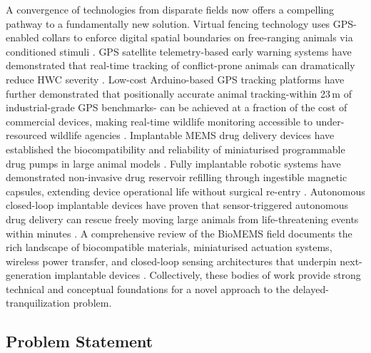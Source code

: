 \documentclass[12pt,a4paper]{article}
\begin{document}
    A convergence of technologies from disparate fields now offers a compelling pathway to a
    fundamentally new solution. Virtual fencing technology uses GPS-enabled collars to enforce
    digital spatial boundaries on free-ranging animals via conditioned stimuli \cite{gilbert2026}.
    GPS satellite telemetry-based early warning systems have demonstrated that real-time
    tracking of conflict-prone animals can dramatically reduce HWC severity \cite{muliya2026}.
    Low-cost Arduino-based GPS tracking platforms have further demonstrated that
    positionally accurate animal tracking-within 23\,m of industrial-grade GPS benchmarks-
    can be achieved at a fraction of the cost of commercial devices, making real-time wildlife
    monitoring accessible to under-resourced wildlife agencies \cite{imamoglu2022}. Implantable
    MEMS drug delivery devices have established the biocompatibility and reliability of
    miniaturised programmable drug pumps in large animal models \cite{gutierrez2014}. Fully
    implantable robotic systems have demonstrated non-invasive drug reservoir refilling through
    ingestible magnetic capsules, extending device operational life without surgical re-entry
    \cite{iacovacci2021}. Autonomous closed-loop implantable devices have proven that
    sensor-triggered autonomous drug delivery can rescue freely moving large animals from
    life-threatening events within minutes \cite{ciatti2024}. A comprehensive review of the
    BioMEMS field documents the rich landscape of biocompatible materials, miniaturised
    actuation systems, wireless power transfer, and closed-loop sensing architectures that
    underpin next-generation implantable devices \cite{abhinav2025}. Collectively, these bodies
    of work provide strong technical and conceptual foundations for a novel approach to the
    delayed-tranquilization problem.

    \subsection{Problem Statement}
\end{document}
